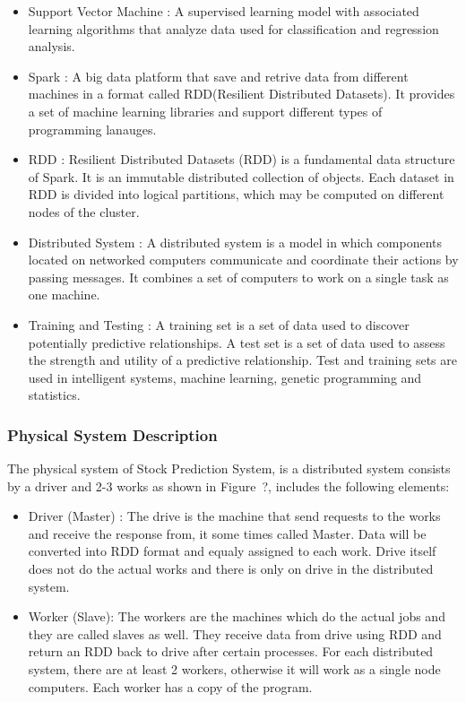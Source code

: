 \documentclass[12pt]{article}
\newcommand{\progname}{Stock Prediction System} %
\begin{document}
\begin{itemize}

\item Support Vector Machine  :
A supervised learning model with associated learning algorithms that analyze data used for classification and regression analysis.
\item Spark :
A big data platform that save and retrive data from different machines in a format called RDD(Resilient Distributed Datasets). It provides a set of machine learning libraries and support different types of programming lanauges. 
\item RDD :
Resilient Distributed Datasets (RDD) is a fundamental data structure of Spark. It is an immutable distributed collection of objects. Each dataset in RDD is divided into logical partitions, which may be computed on different nodes of the cluster.
\item Distributed System :
A distributed system is a model in which components located on networked computers communicate and coordinate their actions by passing messages. It combines a set of computers to work on a single task as one machine.
\item Training and Testing :
A training set is a set of data used to discover potentially predictive relationships. A test set is a set of data used to assess the strength and utility of a predictive relationship. Test and training sets are used in intelligent systems, machine learning, genetic programming and statistics.

\end{itemize}

\subsubsection{Physical System Description}

The physical system of \progname{}, is a distributed system consists by a driver and 2-3 works as shown in Figure~?,
includes the following elements:

\begin{itemize}

\item Driver (Master) : 
The drive is the machine that send requests to the works and receive the response from, it some times called Master. Data will be converted into RDD format and equaly assigned to each work. Drive itself does not do the actual works and there is only on drive in the distributed system.

\item Worker (Slave): 
The workers are the machines which do the actual jobs and they are called slaves as well. They receive data from drive using RDD and return an RDD back to drive after certain processes.  For each distributed system, there are at least 2 workers, otherwise it will work as a single node computers. Each worker has a copy of the program.  


\end{itemize}
\end{document}
